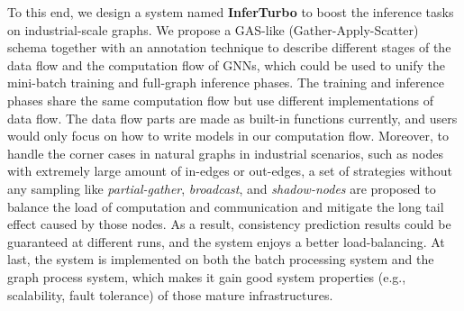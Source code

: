 \documentclass[conference]{IEEEtran}
\begin{document}
To this end, we design a system named \textbf{InferTurbo} to boost the inference tasks on industrial-scale graphs. 
We propose a GAS-like (Gather-Apply-Scatter) schema\cite{b19} together with an annotation technique to describe different stages of the data flow and the computation flow of GNNs, which could be used to unify the mini-batch training and full-graph inference phases.
The training and inference phases share the same computation flow but use different implementations of data flow.
The data flow parts are made as built-in functions currently, and users would only focus on how to write models in our computation flow.
Moreover, to handle the corner cases in natural graphs in industrial scenarios, such as nodes with extremely large amount of in-edges or out-edges, a set of strategies without any sampling like \emph{partial-gather}, \emph{broadcast}, and \emph{shadow-nodes} are proposed to balance the load of computation and communication and mitigate the long tail effect caused by those nodes.
As a result, consistency prediction results could be guaranteed at different runs, and the system enjoys a better load-balancing.
At last, the system is implemented on both the batch processing system\cite{b20,b21} and the graph process system\cite{b22}, which makes it gain good system properties (e.g., scalability, fault tolerance) of those mature infrastructures.
\end{document}

